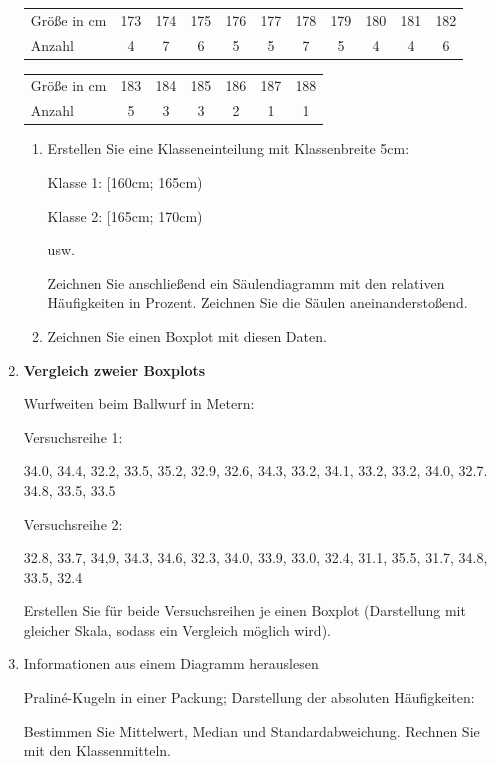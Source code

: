 \begin{enumerate}
 \begin{tabular}{lcccccccccc}
   Größe in cm & 173 & 174 & 175 & 176 & 177 & 178 & 179 & 180 & 181 & 182\\
   Anzahl      &  4  &  7  &  6  &  5  &  5  &  7  &  5  &  4  &  4  &  6
   \end{tabular}

  \begin{tabular}{lcccccc}
   Größe in cm & 183 & 184 & 185 & 186 & 187 & 188\\
   Anzahl      &  5  &  3  &  3  &  2  &  1  &  1 
  \end{tabular}

  \begin{enumerate}[label=\alph*)]
  \item Erstellen Sie eine Klasseneinteilung mit Klassenbreite 5cm:

    Klasse 1: [160cm; 165cm)

      Klasse 2: [165cm; 170cm)

        usw.

        Zeichnen Sie anschließend ein Säulendiagramm mit den relativen
        Häufigkeiten in Prozent. Zeichnen Sie die Säulen
        aneinanderstoßend.

        \item Zeichnen Sie einen Boxplot mit diesen Daten.
\end{enumerate}


\item \textbf{Vergleich zweier Boxplots}

  Wurfweiten beim Ballwurf in Metern:

  Versuchsreihe 1:

  34.0, 34.4, 32.2, 33.5, 35.2, 32.9, 32.6, 34.3, 33.2, 34.1,
  33.2, 33.2, 34.0, 32.7. 34.8, 33.5, 33.5

  Versuchsreihe 2:

  32.8, 33.7, 34,9, 34.3, 34.6, 32.3, 34.0, 33.9, 33.0, 32.4,
  31.1, 35.5, 31.7, 34.8, 33.5, 32.4

  Erstellen Sie für beide Versuchsreihen je einen Boxplot (Darstellung
  mit gleicher Skala, sodass ein Vergleich möglich wird).



  \item{Informationen aus einem Diagramm herauslesen}

    Praliné-Kugeln in einer Packung; Darstellung der absoluten
    Häufigkeiten:
    

Bestimmen Sie Mittelwert, Median und Standardabweichung.
Rechnen Sie mit den Klassenmitteln.

\end{enumerate}


